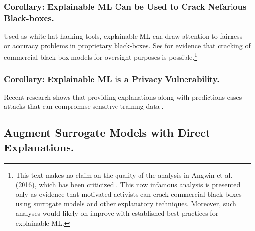 \documentclass[sigconf]{acmart}
\begin{document}
\subsubsection{Corollary: Explainable ML Can be Used to Crack Nefarious Black-boxes.} Used as white-hat hacking tools, explainable ML can draw attention to fairness or accuracy problems in proprietary black-boxes. See \citet{angwin16} for evidence that cracking of commercial black-box models for oversight purposes is possible.\footnote{This text makes no claim on the quality of the analysis in Angwin et al. (2016), which has been criticized \cite{flores2016false}. This now infamous analysis is presented only as evidence that motivated activists can crack commercial black-boxes using surrogate models and other explanatory techniques. Moreover, such analyses would likely on improve with established best-practices for explainable ML.} 

\subsubsection{Corollary: Explainable ML is a Privacy Vulnerability.} Recent research shows that providing explanations along with predictions eases attacks that can compromise sensitive training data \cite{shokri2019privacy}. 

\subsection{Augment Surrogate Models with Direct Explanations.} \label{sec:surrogate}
\end{document}
